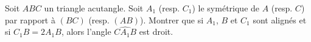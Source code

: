 Soit $ABC$ un triangle acutangle. Soit $A_1$ (resp. $C_1$) le symétrique de $A$ (resp. $C$) par rapport à $(BC)$ (resp. $(AB)$). Montrer que si $A_1$, $B$ et $C_1$ sont alignés et si $C_1B = 2A_1B$, alors l'angle $\widehat{CA_1B}$ est droit.
